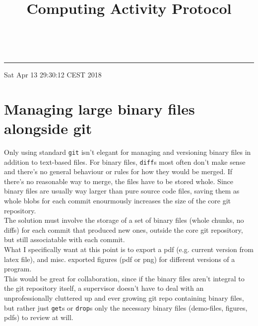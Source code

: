 \documentclass[12pt]{article}
\newenvironment{problem}[2][Problem]{\begin{trivlist}
\item[\hskip \labelsep {\bfseries #1}\hskip \labelsep {\bfseries #2.}]}{\end{trivlist}}
\begin{document}
\title{\vspace{-2cm}Computing Activity Protocol}
\maketitle
\ \\ \noindent\rule{\textwidth}{1pt}
Sat Apr 13 29:30:12 CEST 2018
\section*{Managing large binary files alongside git}
\begin{problem}{1}
    Only using standard \texttt{git} isn't elegant for managing and versioning binary files in addition to text-based files. For binary files, \texttt{diff}s most often don't make sense and there's no general behaviour or rules for how they would be merged. If there's no reasonable way to merge, the files have to be stored whole. Since binary files are usually way larger than pure source code files, saving them as whole blobs for each commit enourmously increases the size of the core git repository. \\ The solution must involve the storage of a set of binary files (whole chunks, no diffs) for each commit that produced new ones, outside the core git repository, but still associatable with each commit. \\
What I specifically want at this point is to export a pdf (e.g. current version from latex file), and misc. exported figures (pdf or png) for different versions of a program. \\ This would be great for collaboration, since if the binary files aren't integral to the git repository itself, a supervisor doesn't have to deal with an unprofessionally cluttered up and ever growing git repo containing binary files, but rather just \texttt{get}s or \texttt{drop}s only the necessary binary files (demo-files, figures, pdfs) to review at will. 
\end{problem}
\end{document}

